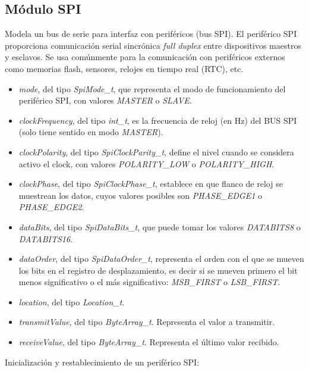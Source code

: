 \subsection{Módulo SPI}

Modela un bus de serie para interfaz con periféricos (bus SPI). El periférico SPI proporciona comunicación serial sincrónica \emph{full duplex} entre dispositivos maestros y esclavos. Se usa comúnmente para la comunicación con periféricos externos como memorias flash, sensores, relojes en tiempo real (RTC), etc.


\begin{itemize}
\item
\emph{mode}, del tipo \emph{SpiMode\_t}, que representa el modo de funcionamiento del periférico SPI, con valores \emph{MASTER} o \emph{SLAVE}.
\item
\emph{clockFrequency}, del tipo \emph{int\_t}, es la frecuencia de reloj (en Hz) del BUS SPI (solo tiene sentido en modo \emph{MASTER}).
\item
\emph{clockPolarity}, del tipo \emph{SpiClockParity\_t}, define el nivel cuando se considera activo el clock, con valores \emph{POLARITY\_LOW} o \emph{POLARITY\_HIGH}.
\item
\emph{clockPhase}, del tipo \emph{SpiClockPhase\_t}, establece en que flanco de reloj se muestrean los datos, cuyos valores posibles son \emph{PHASE\_EDGE1} o \emph{PHASE\_EDGE2}.
\item
\emph{dataBits}, del tipo \emph{SpiDataBits\_t}, que puede tomar los valores \emph{DATABITS8} o \emph{DATABITS16}.
\item
\emph{dataOrder}, del tipo \emph{SpiDataOrder\_t}, representa el orden con el que se mueven los bits en el registro de desplazamiento, es decir si se mueven primero el bit menos significativo o el más significativo: \emph{MSB\_FIRST} o \emph{LSB\_FIRST}.
\item
\emph{location}, del tipo \emph{Location\_t}.
\item
\emph{transmitValue}, del tipo \emph{ByteArray\_t}. Representa el valor a transmitir.
\item
\emph{receiveValue}, del tipo \emph{ByteArray\_t}. Representa el último valor recibido. 
\end{itemize}


Inicialización y restablecimiento de un periférico SPI:

